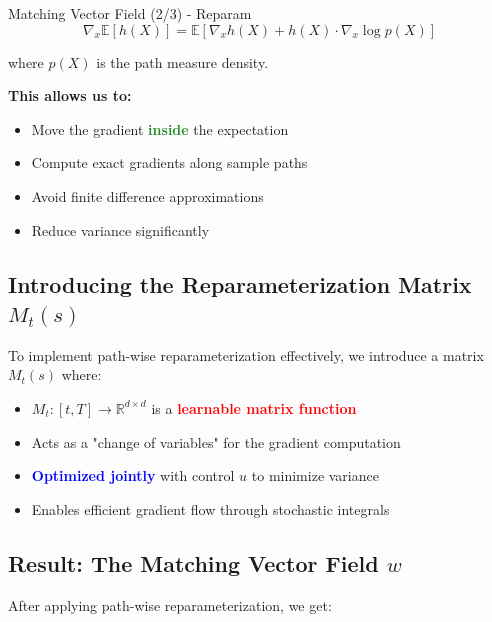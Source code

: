 \documentclass[aspectratio=169,xcolor=dvipsnames]{beamer}
\begin{document}
\begin{frame}[allowframebreaks]{Matching Vector Field (2/3) - Reparam}
    $$\nabla_x \mathbb{E}[h(X)] = \mathbb{E}[\nabla_x h(X) + h(X) \cdot \nabla_x \log p(X)]$$
    
    where $p(X)$ is the path measure density.
    
    \vspace{0.5cm}
    
    \textbf{This allows us to:}
    \begin{itemize}
        \item Move the gradient \textcolor{ForestGreen}{\textbf{inside}} the expectation
        \item Compute exact gradients along sample paths
        \item Avoid finite difference approximations
        \item Reduce variance significantly
    \end{itemize}
    
    \vspace{0.8cm}
    
    \subsection*{Introducing the Reparameterization Matrix $M_t(s)$}
    
    To implement path-wise reparameterization effectively, we introduce a matrix $M_t(s)$ where:
    \begin{itemize}
        \item $M_t : [t,T] \rightarrow \mathbb{R}^{d \times d}$ is a \textcolor{red}{\textbf{learnable matrix function}}
        \item Acts as a "change of variables" for the gradient computation
        \item \textcolor{blue}{\textbf{Optimized jointly}} with control $u$ to minimize variance
        \item Enables efficient gradient flow through stochastic integrals
    \end{itemize}
    
    \vspace{0.8cm}
    
    \subsection*{Result: The Matching Vector Field $w$}
    
    After applying path-wise reparameterization, we get:
    

\end{frame}
\end{document}
